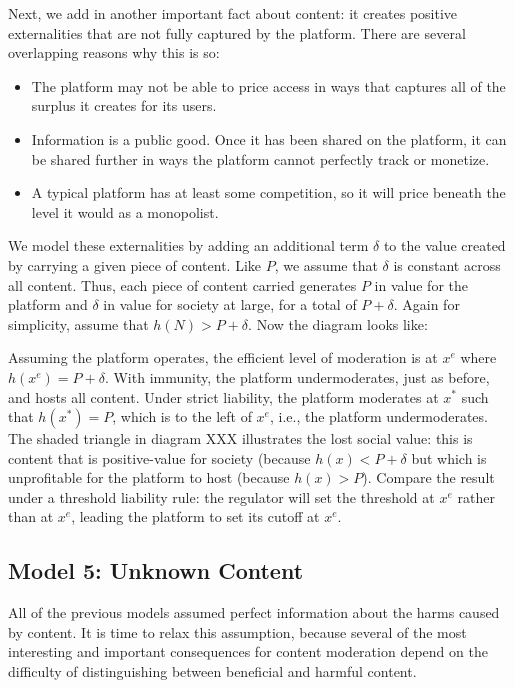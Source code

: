 Next, we add in another important fact about content: it creates positive externalities that are not fully captured by the platform. There are several overlapping reasons why this is so:

\begin{itemize}
\item The platform may not be able to price access in ways that captures all of the surplus it creates for its users.
\item Information is a public good. Once it has been shared on the platform, it can be shared further in ways the platform cannot perfectly track or monetize.
\item A typical platform has at least some competition, so it will price beneath the level it would as a monopolist.
\end{itemize}

We model these externalities by adding an additional term $\delta$ to the value created by carrying a given piece of content. Like $P$, we assume that $\delta$ is constant across all content. Thus, each piece of content carried generates $P$ in value for the platform and $\delta$ in value for society at large, for a total of $P + \delta$. Again for simplicity, assume that $h(N) > P + \delta$. Now the diagram looks like:


Assuming the platform operates, the efficient level of moderation is at $x^e$ where $h(x^e) = P + \delta$. With immunity, the platform undermoderates, just as before, and hosts all content. Under strict liability, the platform moderates at $x^*$ such that $h(x^*) = P$, which is to the left of $x^e$, i.e., the platform undermoderates. The shaded triangle in diagram XXX illustrates the lost social value: this is content that is positive-value for society (because $h(x) < P + \delta$ but which is unprofitable for the platform to host (because $h(x) > P$). Compare the result under a threshold liability rule: the regulator will set the threshold at $x^e$ rather than at $x^e$, leading the platform to set its cutoff at $x^e$.




\subsection{Model 5: Unknown Content}

All of the previous models assumed perfect information about the harms caused by content. It is time to relax this assumption, because several of the most interesting and important consequences for content moderation depend on the difficulty of distinguishing between beneficial and harmful content.

